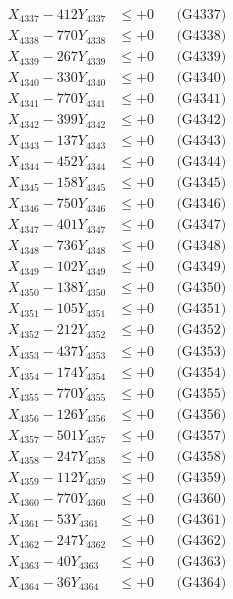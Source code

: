 \documentclass[a4paper,10pt]{article}
\begin{document}
{\begin{align}
X_{4337} - 412Y_{4337} &\leq +0 && \text{(G4337)} \\
X_{4338} - 770Y_{4338} &\leq +0 && \text{(G4338)} \\
X_{4339} - 267Y_{4339} &\leq +0 && \text{(G4339)} \\
X_{4340} - 330Y_{4340} &\leq +0 && \text{(G4340)} \\
\allowbreak
X_{4341} - 770Y_{4341} &\leq +0 && \text{(G4341)} \\
X_{4342} - 399Y_{4342} &\leq +0 && \text{(G4342)} \\
X_{4343} - 137Y_{4343} &\leq +0 && \text{(G4343)} \\
X_{4344} - 452Y_{4344} &\leq +0 && \text{(G4344)} \\
X_{4345} - 158Y_{4345} &\leq +0 && \text{(G4345)} \\
X_{4346} - 750Y_{4346} &\leq +0 && \text{(G4346)} \\
X_{4347} - 401Y_{4347} &\leq +0 && \text{(G4347)} \\
X_{4348} - 736Y_{4348} &\leq +0 && \text{(G4348)} \\
X_{4349} - 102Y_{4349} &\leq +0 && \text{(G4349)} \\
X_{4350} - 138Y_{4350} &\leq +0 && \text{(G4350)} \\
\allowbreak
X_{4351} - 105Y_{4351} &\leq +0 && \text{(G4351)} \\
X_{4352} - 212Y_{4352} &\leq +0 && \text{(G4352)} \\
X_{4353} - 437Y_{4353} &\leq +0 && \text{(G4353)} \\
X_{4354} - 174Y_{4354} &\leq +0 && \text{(G4354)} \\
X_{4355} - 770Y_{4355} &\leq +0 && \text{(G4355)} \\
X_{4356} - 126Y_{4356} &\leq +0 && \text{(G4356)} \\
X_{4357} - 501Y_{4357} &\leq +0 && \text{(G4357)} \\
X_{4358} - 247Y_{4358} &\leq +0 && \text{(G4358)} \\
X_{4359} - 112Y_{4359} &\leq +0 && \text{(G4359)} \\
X_{4360} - 770Y_{4360} &\leq +0 && \text{(G4360)} \\
\allowbreak
X_{4361} - 53Y_{4361} &\leq +0 && \text{(G4361)} \\
X_{4362} - 247Y_{4362} &\leq +0 && \text{(G4362)} \\
X_{4363} - 40Y_{4363} &\leq +0 && \text{(G4363)} \\
X_{4364} - 36Y_{4364} &\leq +0 && \text{(G4364)} \\

\end{align}}
\end{document}

